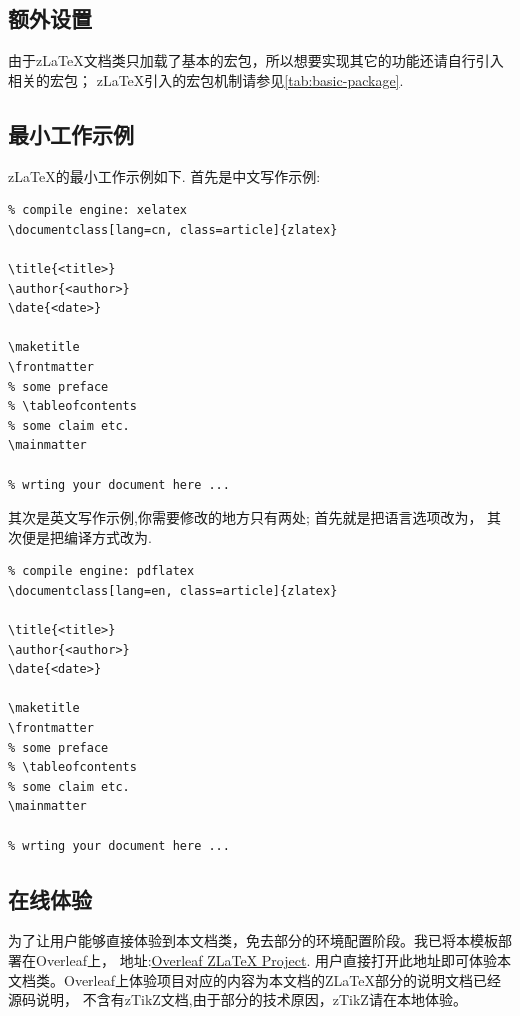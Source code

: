 \subsection{额外设置}
由于z\LaTeX{}文档类只加载了基本的宏包，所以想要实现其它的功能还请自行引入相关的宏包；
z\LaTeX{}引入的宏包机制请参见\cref{tab:basic-package}.

\subsection{最小工作示例}
z\LaTeX{}的最小工作示例如下.
首先是中文写作示例:

\begin{verbatim}
% compile engine: xelatex 
\documentclass[lang=cn, class=article]{zlatex}

\title{<title>}
\author{<author>}
\date{<date>}

\maketitle
\frontmatter
% some preface
% \tableofcontents
% some claim etc.
\mainmatter

% wrting your document here ...

\end{verbatim}

其次是英文写作示例,你需要修改的地方只有两处; 首先就是把语言选项改为，
其次便是把编译方式改为.

\begin{verbatim}
% compile engine: pdflatex 
\documentclass[lang=en, class=article]{zlatex}

\title{<title>}
\author{<author>}
\date{<date>}

\maketitle
\frontmatter
% some preface
% \tableofcontents
% some claim etc.
\mainmatter

% wrting your document here ...

\end{verbatim}

\subsection{在线体验}
为了让用户能够直接体验到本文档类，免去部分的环境配置阶段。我已将本模板部署在Overleaf上，
地址:\href{https://www.overleaf.com/project/661fd2772cafbff9df5e6fb4}{Overleaf ZLaTeX Project}.
用户直接打开此地址即可体验本文档类。Overleaf上体验项目对应的内容为本文档的Z\LaTeX{}部分的说明文档已经源码说明，
不含有zTikZ文档,由于部分的技术原因，zTikZ请在本地体验。


